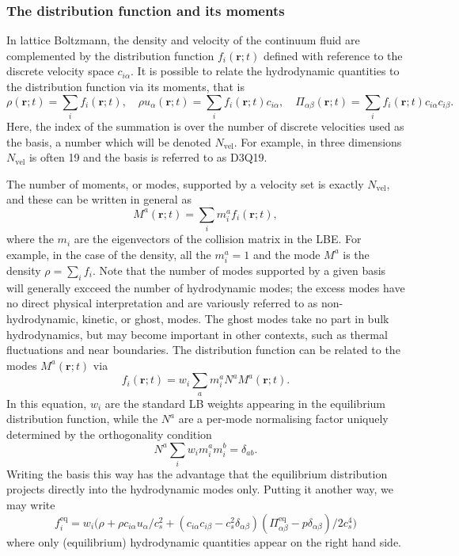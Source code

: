 \subsubsection{The distribution function and its moments}

In lattice Boltzmann, the density and velocity of the continuum fluid
are complemented by the  distribution function
$f_i(\mathbf{r}; t)$ defined with reference to the
discrete velocity space $c_{i\alpha}$.
It is possible to relate the hydrodynamic quantities to the distribution
function via its moments, that is
\begin{equation}
\rho(\mathbf{r};t) = \sum_i f_i(\mathbf{r};t),  \quad
\rho u_\alpha(\mathbf{r};t) = \sum_i f_i(\mathbf{r};t) c_{i\alpha},  \quad
\Pi_{\alpha\beta}(\mathbf{r};t) =
\sum_i f_i(\mathbf{r};t) c_{i\alpha} c_{i\beta}.
\label{equation-lb-f-moments}
\end{equation}
Here, the index of the summation is over the number of discrete
velocities used as the basis, a number which will be denoted
$N_\mathrm{vel}$. For example, in three dimensions
$N_\mathrm{vel}$ is often 19 and the basis is referred to as D3Q19.

The number of moments, or modes, supported by a velocity
set is exactly $N_\mathrm{vel}$, and these can be written in general as
\begin{equation}
M^a(\mathbf{r};t) = \sum_i m_i^a f_i(\mathbf{r};t),
\end{equation}
where the $m_i$ are the eigenvectors of the collision matrix in the LBE.
For example, in the case of the density, all the 
$m_i^a = 1$ and the mode $M^a$ is the density $\rho = \sum_i f_i$. Note
that the number of modes supported by a given basis will generally excceed the
number of hydrodynamic modes; the excess modes have no direct physical
interpretation and are variously referred to as non-hydrodynamic, kinetic,
or ghost, modes.
The ghost modes take no part in bulk hydrodynamics, but may become important
in other contexts, such as thermal fluctuations and near boundaries.
The distribution function can be related to the modes
$M^a(\mathbf{r};t)$ via
\begin{equation}
f_i(\mathbf{r};t) = w_i \sum_a m_i^a N^a M^a(\mathbf{r};t).
\end{equation}
In this equation, $w_i$ are the standard LB weights appearing in the
equilibrium distribution function, while the $N^a$ are a per-mode
normalising factor uniquely determined by the orthogonality condition
\begin{equation}
N^a \sum_i w_i m_i^a m_i^b = \delta_{ab}.
\end{equation}
Writing the basis this way has the advantage that the equilibrium
distribution projects directly into the hydrodynamic modes only.
Putting it another way, we may write
\begin{equation}
f_i^\mathrm{eq} = w_i \big(\rho + \rho c_{i\alpha}u_\alpha / c_s^2
+ (c_{i\alpha} c_{i\beta} - c_s^2\delta_{\alpha\beta})
(\Pi_{\alpha\beta}^\mathrm{eq} - p\delta_{\alpha\beta})/2c_s^4 \big)
\end{equation}
where only (equilibrium) hydrodynamic quantities appear on the right hand side.

